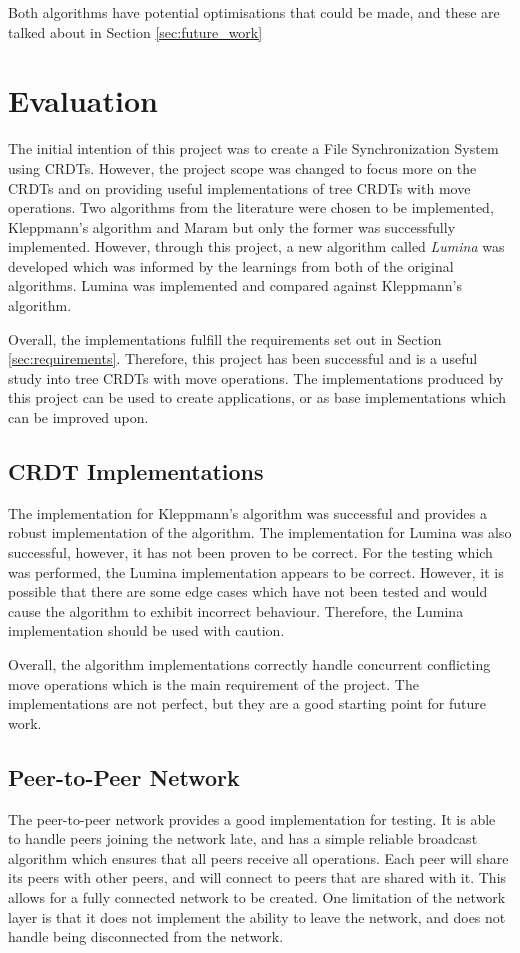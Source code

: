 \documentclass[12pt]{report}
\begin{document}
Both algorithms have potential optimisations that could be made, and these are talked about in Section \ref{sec:future_work}

\chapter{Evaluation}
The initial intention of this project was to create a File Synchronization System using CRDTs. However, the project scope was changed to focus more on the CRDTs and on providing useful implementations of tree CRDTs with move operations. Two algorithms from the literature were chosen to be implemented, Kleppmann's algorithm\cite{9563274} and Maram\cite{https://doi.org/10.48550/arxiv.2103.04828} but only the former was successfully implemented. However, through this project, a new algorithm called \textit{Lumina} was developed which was informed by the learnings from both of the original algorithms. Lumina was implemented and compared against Kleppmann's algorithm. \par 

Overall, the implementations fulfill the requirements set out in Section \ref{sec:requirements}. Therefore, this project has been successful and is a useful study into tree CRDTs with move operations. The implementations produced by this project can be used to create applications, or as base implementations which can be improved upon. \par

\section{CRDT Implementations}
The implementation for Kleppmann's algorithm was successful and provides a robust implementation of the algorithm. The implementation for Lumina was also successful, however, it has not been proven to be correct. For the testing which was performed, the Lumina implementation appears to be correct. However, it is possible that there are some edge cases which have not been tested and would cause the algorithm to exhibit incorrect behaviour. Therefore, the Lumina implementation should be used with caution. \par

Overall, the algorithm implementations correctly handle concurrent conflicting move operations which is the main requirement of the project. The implementations are not perfect, but they are a good starting point for future work.

\section{Peer-to-Peer Network}
The peer-to-peer network provides a good implementation for testing. It is able to handle peers joining the network late, and has a simple reliable broadcast algorithm which ensures that all peers receive all operations. Each peer will share its peers with other peers, and will connect to peers that are shared with it. This allows for a fully connected network to be created. One limitation of the network layer is that it does not implement the ability to leave the network, and does not handle being disconnected from the network. \par
\end{document}
